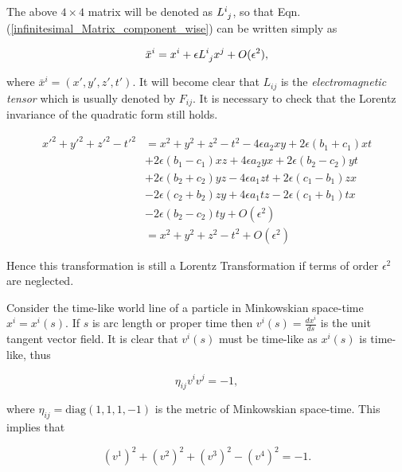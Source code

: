 \noindent The above $4 \times 4$ matrix will be denoted as $\tensor{L}{^i_j}$, so that Eqn.(\ref{infinitesimal_Matrix_component_wise}) can be written simply as 

\begin{equation}\label{Infinitesimal_Infinitesimal_Lorentz_Transformation}
\bar{x}^i = x^i + \epsilon \tensor{L}{^{i}_{j}} x^j + O(\epsilon^2),
\end{equation}

\noindent where $\bar{x}^i = (x',y',z',t')$. It will become clear that $L_{ij}$ is the \textit{electromagnetic tensor} which is usually denoted by $F_{ij}$. It is necessary to check that the Lorentz invariance of the quadratic form still holds. 

\begin{align*}
{x'}^2 + {y'}^2 + {z'}^2 - {t'}^2 & = x^2 + y^2 + z^2 - t^2 - 4\epsilon a_2 x y + 2 \epsilon(b_1 + c_1)xt \\
                                  & + 2\epsilon (b_1 - c_1)xz + 4 \epsilon a_2 yx + 2\epsilon (b_2 - c_2)yt \\
                                  & + 2 \epsilon (b_2 + c_2)yz - 4\epsilon a_1 zt + 2 \epsilon (c_1 - b_1)zx \\
                                  & -2 \epsilon (c_2 + b_2)zy + 4 \epsilon a_1 tz - 2 \epsilon (c_1 + b_1)tx \\
                                  & -2\epsilon (b_2 - c_2) ty + O(\epsilon^2) \\
                                  & = x^2 + y^2 + z^2 - t^2 + O(\epsilon^2)
\end{align*}

\noindent Hence this transformation is still a Lorentz Transformation if terms of order $\epsilon^2$ are neglected.

Consider the time-like world line of a particle in Minkowskian space-time $x^i = x^i(s)$. If $s$ is arc length or proper time then $v^i(s) = \frac{dx^i}{ds}$ is the unit tangent vector field. It is clear that $v^i(s)$ must be time-like as $x^i(s)$ is time-like, thus

\begin{equation*}
\eta_{ij} v^i v^j = -1,
\end{equation*}

\noindent where $\eta_{ij} = \text{diag}(1,1,1,-1)$ is the metric of Minkowskian space-time. This implies that 

\begin{equation*}
(v^1)^2  + (v^2)^2 + (v^3)^2  - (v^4)^2 = -1.
\end{equation*}

